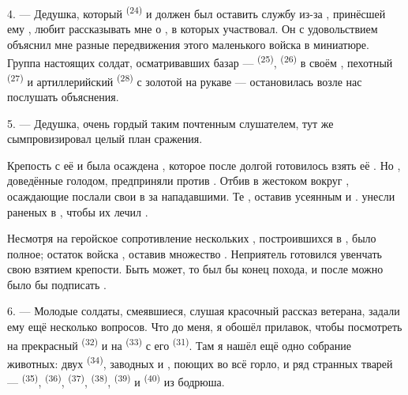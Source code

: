 \VUsaut{4.0mm}
\VUsaut{2.8mm}

4. --- Дедушка, который  \textsuperscript{(24)} и должен был
оставить службу из-за , принёсшей ему ,
любит рассказывать мне о , в которых участвовал. Он с
удовольствием объяснил мне разные передвижения этого маленького войска в
миниатюре. Группа настоящих солдат, осматривавших базар --- 
\textsuperscript{(25)},  \textsuperscript{(26)} в своём
, пехотный  \textsuperscript{(27)} и
артиллерийский  \textsuperscript{(28)} с золотой 
на рукаве --- остановилась возле нас послушать объяснения.

5. --- Дедушка, очень гордый таким почтенным слушателем, тут же
сымпровизировал целый план сражения.

Крепость с её  и  была осаждена
, которое после долгой 
готовилось взять её . Но , доведённые
голодом, предприняли  против 
. Отбив  в жестоком  вокруг
,  осаждающие послали свои
 в  за  нападавшими.
Те , оставив  усеянным 
и .  унесли раненых в
, чтобы их лечил .

Несмотря на геройское сопротивление нескольких ,
построившихся в ,  было полное; остаток
войска , оставив множество . Неприятель
готовился увенчать свою  взятием крепости. Быть может, то был
бы конец похода, и после  можно было бы подписать
.

\VUsaut{4.4mm}
\VUsaut{2.8mm}

6. --- Молодые солдаты, смеявшиеся, слушая красочный рассказ ветерана,
задали ему ещё несколько вопросов. Что до меня, я обошёл прилавок, чтобы
посмотреть на прекрасный  \textsuperscript{(32)} и на 
\textsuperscript{(33)} с его  \textsuperscript{(31)}. Там я нашёл ещё
одно собрание животных: двух  \textsuperscript{(34)},
заводных  и , поющих во всё горло, и ряд
странных тварей ---  \textsuperscript{(35)}, 
\textsuperscript{(36)},  \textsuperscript{(37)}, 
\textsuperscript{(38)},  \textsuperscript{(39)} и 
\textsuperscript{(40)} из бодрюша.

